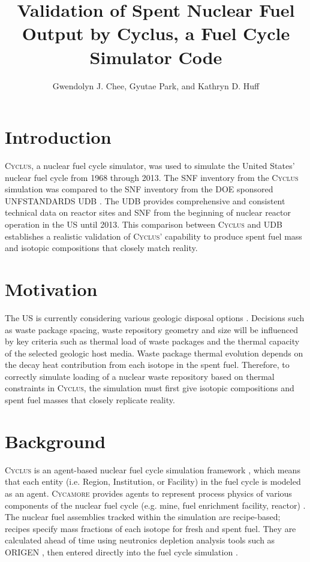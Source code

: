 \documentclass{anstrans}
\title{Validation of Spent Nuclear Fuel Output by Cyclus, a Fuel Cycle Simulator Code}
\author{Gwendolyn J. Chee, Gyutae Park, and Kathryn D. Huff}
\institute{
Dept. of Nuclear, Plasma and Radiological Engineering, University of Illinois at Urbana-Champaign \\
gchee2@illinois.edu
}
\newcommand{\Cyclus}{\textsc{Cyclus}\xspace}%
\newcommand{\Cycamore}{\textsc{Cycamore}\xspace}%
\begin{document}
\section{Introduction}
\Cyclus \cite{carlsen_cyclus_2014}, a nuclear fuel cycle simulator, was used to simulate the
United States' nuclear fuel cycle from 1968 through 2013. The
\gls{SNF} inventory from the \Cyclus simulation was compared to the \gls{SNF} 
inventory from the \gls{DOE} sponsored \gls{UNFSTANDARDS} \gls{UDB} 
\cite{peterson_unf-st&dards_2017}. The \gls{UDB} provides comprehensive and 
consistent technical data on reactor sites and \gls{SNF} from the beginning of 
nuclear reactor operation in the \gls{US} until 2013. This comparison 
between \Cyclus and \gls{UDB} establishes a realistic validation of \Cyclus' 
capability to produce spent fuel mass and isotopic compositions 
that closely match reality.

\section{Motivation}
The \gls{US} is currently considering various geologic disposal 
options \cite{DOE_strategy_2013}. Decisions such as waste package spacing, 
waste repository geometry and size will be influenced by key criteria such as 
thermal load of waste packages and the thermal capacity of the selected 
geologic host media. Waste package thermal evolution depends on the decay heat 
contribution from each isotope in the spent fuel. Therefore, to correctly 
simulate loading of a nuclear waste repository based on thermal constraints in \Cyclus, 
the simulation must first give isotopic compositions and spent fuel masses that 
closely replicate reality. 

\section{Background}
\Cyclus is an agent-based nuclear fuel cycle simulation framework 
\cite{huff_fundamental_2016}, which means that each entity (i.e. Region, 
Institution, or Facility) in the fuel cycle is modeled as an agent. 
\Cycamore \cite{carlsen_cycamore_2014} provides agents to represent process 
physics of various components of the nuclear fuel cycle (e.g. mine, fuel 
enrichment facility, reactor) \cite{huff_extensions_2014}. The nuclear fuel 
assemblies tracked within the simulation are recipe-based; recipes specify mass 
fractions of each isotope for fresh and spent fuel. They are calculated ahead 
of time using neutronics depletion analysis tools such as ORIGEN 
\cite{bell_origen_1973}, then entered directly into the fuel cycle simulation 
\cite{peterson_additional_2017}. 
\end{document}
